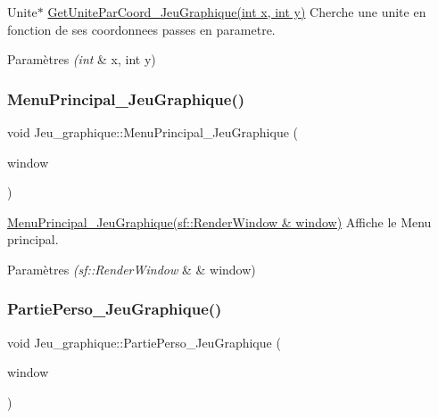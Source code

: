 Unite$\ast$ \hyperlink{classJeu__graphique_ae511b5ba17776963d2e40008e46c1ebc}{Get\+Unite\+Par\+Coord\+\_\+\+Jeu\+Graphique(int x, int y)} Cherche une unite en fonction de ses coordonnees passes en parametre. 


\begin{DoxyParams}{Paramètres}
{\em (int} & x, int y) \\
\hline
\end{DoxyParams}
\mbox{\label{classJeu__graphique_a83b8c542916e2912daec8c8ab8c413ae}} 
\subsubsection{\texorpdfstring{Menu\+Principal\+\_\+\+Jeu\+Graphique()}{MenuPrincipal\_JeuGraphique()}}
{\footnotesize\ttfamily void Jeu\+\_\+graphique\+::\+Menu\+Principal\+\_\+\+Jeu\+Graphique (\begin{DoxyParamCaption}\item[{sf\+::\+Render\+Window \&}]{window }\end{DoxyParamCaption})}



\hyperlink{classJeu__graphique_a83b8c542916e2912daec8c8ab8c413ae}{Menu\+Principal\+\_\+\+Jeu\+Graphique(sf\+::\+Render\+Window \& window)} Affiche le Menu principal. 


\begin{DoxyParams}{Paramètres}
{\em (sf\+::\+Render\+Window} & \& window) \\
\hline
\end{DoxyParams}
\mbox{\label{classJeu__graphique_a2bc7be0611ffbc0589459ba6203e6efe}} 
\subsubsection{\texorpdfstring{Partie\+Perso\+\_\+\+Jeu\+Graphique()}{PartiePerso\_JeuGraphique()}}
{\footnotesize\ttfamily void Jeu\+\_\+graphique\+::\+Partie\+Perso\+\_\+\+Jeu\+Graphique (\begin{DoxyParamCaption}\item[{sf\+::\+Render\+Window \&}]{window }\end{DoxyParamCaption})}



